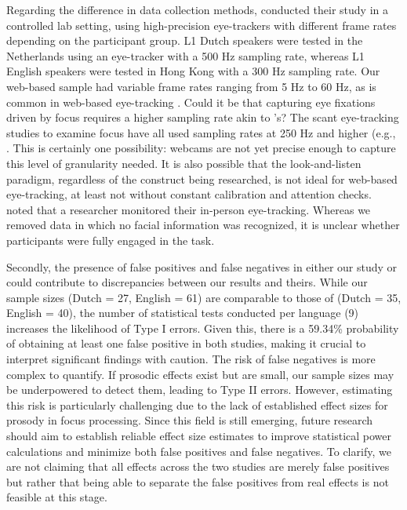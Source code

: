 Regarding the difference in data collection methods, \cite{Ge2021} conducted their study in a controlled lab setting, using high-precision eye-trackers with different frame rates depending on the participant group. L1 Dutch speakers were tested in the Netherlands using an eye-tracker with a 500 Hz sampling rate, whereas L1 English speakers were tested in Hong Kong with a 300 Hz sampling rate. Our web-based sample had variable frame rates ranging from 5 Hz to 60 Hz, as is common in web-based eye-tracking \citep{Vos_2022,AOW}. Could it be that capturing eye fixations driven by focus requires a higher sampling rate akin to \cite{Ge2021}'s? The scant eye-tracking studies to examine focus have all used sampling rates at 250 Hz and higher (e.g., \cite{gennari200511, jansen2023influence, mulders2016early}. This is certainly one possibility: webcams are not yet precise enough to capture this level of granularity needed. It is also possible that the look-and-listen paradigm, regardless of the construct being researched, is not ideal for web-based eye-tracking, at least not without constant calibration and attention checks. \cite{Ge2021} noted that a researcher monitored their in-person eye-tracking. Whereas we removed data in which no facial information was recognized, it is unclear whether participants were fully engaged in the task. 

Secondly, the presence of false positives and false negatives in either our study or \cite{Ge2021} could contribute to discrepancies between our results and theirs. While our sample sizes (Dutch = 27, English = 61) are comparable to those of \cite{Ge2021} (Dutch = 35, English = 40), the number of statistical tests conducted per language (9) increases the likelihood of Type I errors. Given this, there is a 59.34\% probability of obtaining at least one false positive in both studies, making it crucial to interpret significant findings with caution. The risk of false negatives is more complex to quantify. If prosodic effects exist but are small, our sample sizes may be underpowered to detect them, leading to Type II errors. However, estimating this risk is particularly challenging due to the lack of established effect sizes for prosody in focus processing. Since this field is still emerging, future research should aim to establish reliable effect size estimates to improve statistical power calculations and minimize both false positives and false negatives. To clarify, we are not claiming that all effects across the two studies are merely false positives but rather that being able to separate the false positives from real effects is not feasible at this stage.

